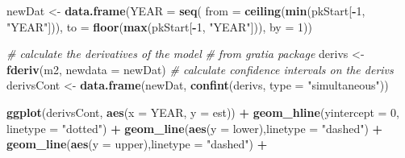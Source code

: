\documentclass[nofonts,]{tufte-handout}
\newenvironment{Shaded}{\begin{snugshade}}{\end{snugshade}}
\newcommand{\AttributeTok}[1]{\textcolor[rgb]{0.13,0.29,0.53}{#1}}
\newcommand{\CommentTok}[1]{\textcolor[rgb]{0.56,0.35,0.01}{\textit{#1}}}
\newcommand{\DecValTok}[1]{\textcolor[rgb]{0.00,0.00,0.81}{#1}}
\newcommand{\FunctionTok}[1]{\textcolor[rgb]{0.13,0.29,0.53}{\textbf{#1}}}
\newcommand{\NormalTok}[1]{#1}
\newcommand{\OtherTok}[1]{\textcolor[rgb]{0.56,0.35,0.01}{#1}}
\newcommand{\SpecialCharTok}[1]{\textcolor[rgb]{0.81,0.36,0.00}{\textbf{#1}}}
\newcommand{\StringTok}[1]{\textcolor[rgb]{0.31,0.60,0.02}{#1}}
\begin{document}
\begin{Shaded}
\begin{Highlighting}[]
\NormalTok{newDat }\OtherTok{\textless{}{-}} \FunctionTok{data.frame}\NormalTok{(}\AttributeTok{YEAR =} \FunctionTok{seq}\NormalTok{(}
  \AttributeTok{from =} \FunctionTok{ceiling}\NormalTok{(}\FunctionTok{min}\NormalTok{(pkStart[}\SpecialCharTok{{-}}\DecValTok{1}\NormalTok{, }\StringTok{"YEAR"}\NormalTok{])),}
  \AttributeTok{to =} \FunctionTok{floor}\NormalTok{(}\FunctionTok{max}\NormalTok{(pkStart[}\SpecialCharTok{{-}}\DecValTok{1}\NormalTok{, }\StringTok{"YEAR"}\NormalTok{])),}
  \AttributeTok{by =} \DecValTok{1}\NormalTok{))}

\CommentTok{\# calculate the derivatives of the model}
\CommentTok{\# from gratia package}
\NormalTok{derivs }\OtherTok{\textless{}{-}} \FunctionTok{fderiv}\NormalTok{(m2, }\AttributeTok{newdata =}\NormalTok{ newDat) }
\CommentTok{\# calculate confidence intervals on the derivs}
\NormalTok{derivsCont }\OtherTok{\textless{}{-}} \FunctionTok{data.frame}\NormalTok{(newDat, }
                         \FunctionTok{confint}\NormalTok{(derivs, }
                                 \AttributeTok{type =} \StringTok{"simultaneous"}\NormalTok{))}


 \FunctionTok{ggplot}\NormalTok{(derivsCont, }\FunctionTok{aes}\NormalTok{(}\AttributeTok{x =}\NormalTok{ YEAR, }\AttributeTok{y =}\NormalTok{ est)) }\SpecialCharTok{+}
   \FunctionTok{geom\_hline}\NormalTok{(}\AttributeTok{yintercept =} \DecValTok{0}\NormalTok{, }\AttributeTok{linetype =} \StringTok{"dotted"}\NormalTok{) }\SpecialCharTok{+}
   \FunctionTok{geom\_line}\NormalTok{(}\FunctionTok{aes}\NormalTok{(}\AttributeTok{y =}\NormalTok{ lower),}\AttributeTok{linetype =} \StringTok{"dashed"}\NormalTok{) }\SpecialCharTok{+}
   \FunctionTok{geom\_line}\NormalTok{(}\FunctionTok{aes}\NormalTok{(}\AttributeTok{y =}\NormalTok{ upper),}\AttributeTok{linetype =} \StringTok{"dashed"}\NormalTok{) }\SpecialCharTok{+}
   

\end{Highlighting}
\end{Shaded}
\end{document}
